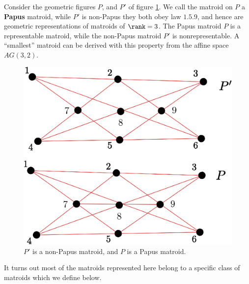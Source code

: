 \begin{example}\label{1.20}
    Consider the geometric figures $P$, and $P'$ of figure \ref{fig_1.15}. We
    call the matroid on $P$ a  \textbf{Papus} matroid, while $P'$ is
    non-Papus they both obey law  $1.5.9$, and hence are geometric
    representations of  matroids of $\rank=3$. The Papus matroid $P$ is a
    representable matroid, while the non-Papus matroid  $P'$ is
    nonrepresentable. A ``smallest'' matroid can be derived with this property
    from the affine space $AG(3,2)$.
    \begin{figure}[h]
        \centering
        \includegraphics[scale=0.8]{Figures/chapter1/paupus_nonpaupus.eps}
        \caption{$P'$ is a non-Papus matroid, and $P$ is a Papus matroid.}
        \label{fig_1.15}
    \end{figure}
\end{example}

It turns out most of the matroids represented here belong to a specific class of
matroids which we define below.

